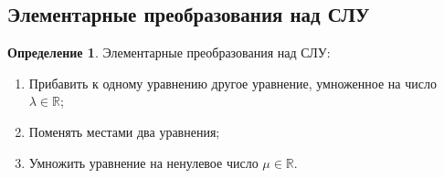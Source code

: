 \documentclass[a4paper, 12pt]{article}
\newcommand{\R}{\mathbb R}
\theoremstyle{definition}
\newtheorem*{definition}{Определение}
\begin{document}
    \subsection{Элементарные преобразования над СЛУ}
    \begin{definition}
      Элементарные преобразования над СЛУ:
      \begin{enumerate}
        \item Прибавить к одному уравнению другое уравнение, умноженное на число $\lambda \in \R$;
        \item Поменять местами два уравнения;
        \item Умножить уравнение на ненулевое число $\mu \in \R$.
      \end{enumerate}
    \end{definition} 
    
\end{document}
